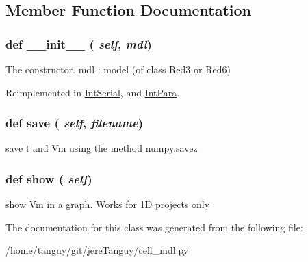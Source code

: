 \subsection{Member Function Documentation}
\hypertarget{classcell__mdl_1_1_int_gen_ac775ee34451fdfa742b318538164070e}{
\subsubsection[{\_\-\_\-init\_\-\_\-}]{\setlength{\rightskip}{0pt plus 5cm}def \_\-\_\-init\_\-\_\- ( {\em self}, \/   {\em mdl})}}
\label{classcell__mdl_1_1_int_gen_ac775ee34451fdfa742b318538164070e}
\begin{DoxyVerb}The constructor.
mdl : model (of class Red3 or Red6)
\end{DoxyVerb}
 

Reimplemented in \hyperlink{classcell__mdl_1_1_int_serial_ac775ee34451fdfa742b318538164070e}{IntSerial}, and \hyperlink{classcell__mdl_1_1_int_para_ac775ee34451fdfa742b318538164070e}{IntPara}.

\hypertarget{classcell__mdl_1_1_int_gen_aba0970ece8740693d3b82e656500a9c0}{
\subsubsection[{save}]{\setlength{\rightskip}{0pt plus 5cm}def save ( {\em self}, \/   {\em filename})}}
\label{classcell__mdl_1_1_int_gen_aba0970ece8740693d3b82e656500a9c0}
\begin{DoxyVerb}save t and Vm using the method numpy.savez\end{DoxyVerb}
 \hypertarget{classcell__mdl_1_1_int_gen_a051649d4f6e0c3c1e1e47d8699feb801}{
\subsubsection[{show}]{\setlength{\rightskip}{0pt plus 5cm}def show ( {\em self})}}
\label{classcell__mdl_1_1_int_gen_a051649d4f6e0c3c1e1e47d8699feb801}
\begin{DoxyVerb}show Vm in a graph. Works for 1D projects only\end{DoxyVerb}
 

The documentation for this class was generated from the following file:\begin{DoxyCompactItemize}
\item 
/home/tanguy/git/jereTanguy/cell\_\-mdl.py\end{DoxyCompactItemize}
